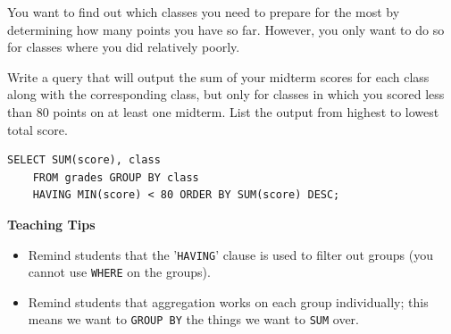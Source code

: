 \begin{blocksection}

You want to find out which classes you need to prepare for the most by determining how many points you have so far. However, you only want to do so for classes where you did relatively poorly.

Write a query that will output the sum of your midterm scores for each class along with the corresponding class, but only for classes in which you scored less than 80 points on at least one midterm. List the output from highest to lowest total score.

\begin{solution}[1.5in]
\begin{lstlisting}
SELECT SUM(score), class
    FROM grades GROUP BY class
    HAVING MIN(score) < 80 ORDER BY SUM(score) DESC;
\end{lstlisting}
\end{solution}
\end{blocksection}

\begin{guide}
\begin{blocksection}
\textbf{Teaching Tips}
\begin{itemize}
    \item Remind students that the '\lstinline{HAVING}' clause is used to filter out groups (you cannot use \lstinline{WHERE} on the groups).
    \item Remind students that aggregation works on each group individually; this means we want to \lstinline{GROUP BY} the things we want to \lstinline{SUM} over.
\end{itemize}
\end{blocksection}
\end{guide}